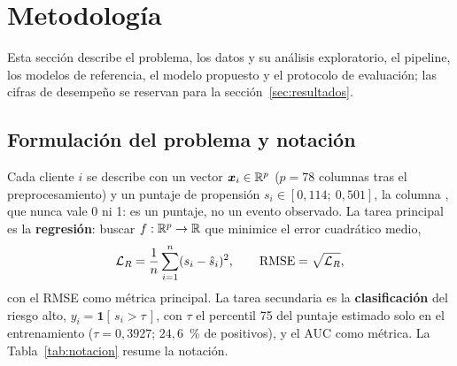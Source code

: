 \section{Metodología}\label{sec:metodologia}

Esta sección describe el problema, los datos y su análisis exploratorio, el pipeline, los modelos de referencia, el
modelo propuesto y el protocolo de evaluación; las cifras de desempeño se reservan para la sección~\ref{sec:resultados}.

\subsection{Formulación del problema y notación}\label{sec:formulacion}

Cada cliente $i$ se describe con un vector $\bm{x}_i \in \mathbb{R}^{p}$ ($p = 78$ columnas tras el preprocesamiento) y un
puntaje de propensión $s_i \in [0{,}114;\ 0{,}501]$, la columna \cp, que nunca vale 0 ni 1: es un puntaje, no un evento
observado. La tarea principal es la \textbf{regresión}: buscar $f: \mathbb{R}^p \to \mathbb{R}$ que minimice el error cuadrático medio,
\begin{equation}
  \mathcal{L}_R = \frac{1}{n}\sum_{i=1}^{n} (s_i - \hat{s}_i)^2, \qquad \mathrm{RMSE} = \sqrt{\mathcal{L}_R},
  \label{eq:perdida}
\end{equation}
con el RMSE como métrica principal. La tarea secundaria es la \textbf{clasificación} del riesgo alto,
$y_i = \mathbf{1}[\,s_i > \tau\,]$, con $\tau$ el percentil 75 del puntaje estimado solo en el entrenamiento
($\tau = 0{,}3927$; $24{,}6$~\% de positivos), y el AUC como métrica. La Tabla~\ref{tab:notacion} resume la notación.

